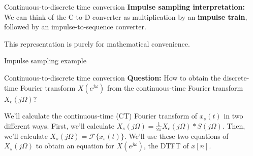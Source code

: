 \documentclass[10pt, aspectratio=169]{beamer}
\begin{document}
%
\begin{frame}{Continuous-to-discrete time conversion}
\textbf{Impulse sampling interpretation:}\\
We can think of the C-to-D converter as multiplication by an \textbf{impulse train}, followed by an impulse-to-sequence converter. 

This representation is purely for mathematical convenience.
\begin{center}
	\resizebox{\linewidth}{!}{}
\end{center}

\end{frame}

\begin{frame}{Impulse sampling example}
\vspace{-0.4cm}
\begin{center}
	\resizebox{0.75\linewidth}{!}{}
\end{center}
\end{frame}

\begin{frame}{Continuous-to-discrete time conversion}
\textbf{Question:} How to obtain the discrete-time Fourier transform $X(e^{j\omega})$ from the continuous-time Fourier transform $X_c(j\Omega)$?
\begin{center}
	\resizebox{0.8\linewidth}{!}{}
\end{center}

We'll calculate the continuous-time (CT) Fourier transform of $x_s(t)$ in two different ways. First, we'll calculate $X_s(j\Omega) = \frac{1}{2\pi}X_c(j\Omega)\ast S(j\Omega)$. Then, we'll calculate $X_s(j\Omega) = \mathcal{F}\{x_s(t)\}$. We'll use these two equations of $X_s(j\Omega)$ to obtain an equation for $X(e^{j\omega})$, the DTFT of $x[n]$.

\end{frame}
\end{document}
